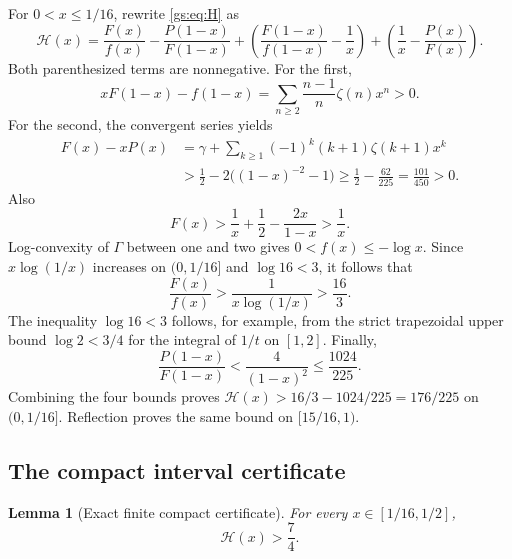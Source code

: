\documentclass[11pt,a4paper]{article}
\numberwithin{equation}{section}
\theoremstyle{plain}
\newtheorem{lemma}[theorem]{Lemma}
\theoremstyle{definition}
\theoremstyle{remark}
\begin{document}
For $0<x\le1/16$, rewrite \eqref{gs:eq:H} as
\[
 \mathcal H(x)=\frac{F(x)}{f(x)}-\frac{P(1-x)}{F(1-x)}
 +\left(\frac{F(1-x)}{f(1-x)}-\frac1x\right)
 +\left(\frac1x-\frac{P(x)}{F(x)}\right).
\]
Both parenthesized terms are nonnegative. For the first,
\[
 xF(1-x)-f(1-x)
 =\sum_{n\ge2}\frac{n-1}{n}\zeta(n)x^n>0.
\]
For the second, the convergent series yields
\begin{align*}
 F(x)-xP(x)
 &=\gamma+\sum_{k\ge1}(-1)^k(k+1)\zeta(k+1)x^k\\
 &>\frac12-2\bigl((1-x)^{-2}-1\bigr)
 \ge\frac12-\frac{62}{225}=\frac{101}{450}>0.
\end{align*}
Also
\[
 F(x)>\frac1x+\frac12-\frac{2x}{1-x}>\frac1x.
\]
Log-convexity of $\Gamma$ between one and two gives
$0<f(x)\le-\log x$. Since $x\log(1/x)$ increases on $(0,1/16]$
and $\log16<3$, it follows that
\[
 \frac{F(x)}{f(x)}>\frac1{x\log(1/x)}>\frac{16}{3}.
\]
The inequality $\log16<3$ follows, for example, from the strict
trapezoidal upper bound $\log2<3/4$ for the integral of $1/t$ on
$[1,2]$. Finally,
\[
 \frac{P(1-x)}{F(1-x)}
 <\frac{4}{(1-x)^2}\le\frac{1024}{225}.
\]
Combining the four bounds proves
$\mathcal H(x)>16/3-1024/225=176/225$ on $(0,1/16]$.
Reflection proves the same bound on $[15/16,1)$.

\subsection{The compact interval certificate}

\begin{lemma}[Exact finite compact certificate]\label{gs:lem:certificate}
For every $x\in[1/16,1/2]$,
\[
 \mathcal H(x)>\frac74.
\]
\end{lemma}
\end{document}
